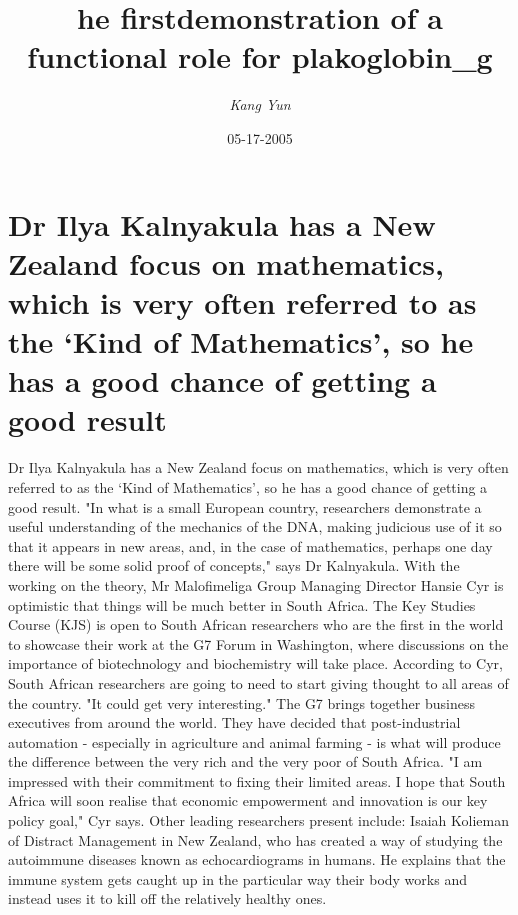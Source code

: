 \documentclass{article}%
\title{he firstdemonstration of a functional role for plakoglobin\_g}%
\author{\textit{Kang Yun}}%
\date{05-17-2005}%
\begin{document}
%
\normalsize%
\maketitle%
\section{Dr Ilya Kalnyakula has a New Zealand focus on mathematics, which is very often referred to as the ‘Kind of Mathematics’, so he has a good chance of getting a good result}%
\label{sec:DrIlyaKalnyakulahasaNewZealandfocusonmathematics,whichisveryoftenreferredtoastheKindofMathematics,sohehasagoodchanceofgettingagoodresult}%
Dr Ilya Kalnyakula has a New Zealand focus on mathematics, which is very often referred to as the ‘Kind of Mathematics’, so he has a good chance of getting a good result.\newline%
"In what is a small European country, researchers demonstrate a useful understanding of the mechanics of the DNA, making judicious use of it so that it appears in new areas, and, in the case of mathematics, perhaps one day there will be some solid proof of concepts," says Dr Kalnyakula.\newline%
With the working on the theory, Mr Malofimeliga Group Managing Director Hansie Cyr is optimistic that things will be much better in South Africa.\newline%
The Key Studies Course (KJS) is open to South African researchers who are the first in the world to showcase their work at the G7 Forum in Washington, where discussions on the importance of biotechnology and biochemistry will take place.\newline%
According to Cyr, South African researchers are going to need to start giving thought to all areas of the country. "It could get very interesting."\newline%
The G7 brings together business executives from around the world. They have decided that post{-}industrial automation {-} especially in agriculture and animal farming {-} is what will produce the difference between the very rich and the very poor of South Africa.\newline%
"I am impressed with their commitment to fixing their limited areas. I hope that South Africa will soon realise that economic empowerment and innovation is our key policy goal," Cyr says.\newline%
Other leading researchers present include:\newline%
Isaiah Kolieman of Distract Management in New Zealand, who has created a way of studying the autoimmune diseases known as echocardiograms in humans. He explains that the immune system gets caught up in the particular way their body works and instead uses it to kill off the relatively healthy ones.\newline%
\end{document}
